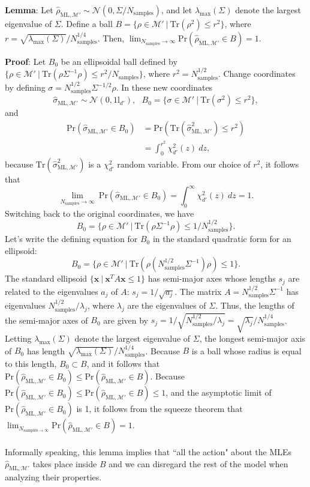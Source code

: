 \documentclass[aps,pra, twocolumn]{revtex4-1}
\newcommand{\M}{\mathcal{M}}
\newcommand{\Id}{\mathbb{I}}
\def\Id{1\!\mathrm{l}}
\newcommand{\rhohat}{\hat{\rho}}
\newcommand{\rhoML}[1]{\rhohat_{\scriptscriptstyle{\mathrm{ML},#1}}}
\begin{document}
\textbf{Lemma}: Let $\rhoML{\M'} \sim \mathcal{N}(0, \Sigma/N_{\mathrm{samples}})$, and let $\lambda_{\max}(\Sigma)$ denote the largest eigenvalue of $\Sigma$. Define a ball $B = \{\rho \in \M' ~|~\mathrm{Tr}(\rho^{2}) \leq r^{2}\}$, where $r = \sqrt{\lambda_{\max}(\Sigma)}/N_{\mathrm{samples}}^{1/4}$. Then, $\lim_{N_{\mathrm{samples}} \rightarrow \infty} \mathrm{Pr}(\rhoML{\M'} \in B) =1$.

\textbf{Proof}: Let $B_{0}$ be an ellipsoidal ball defined by $\{\rho \in \M'~|~\mathrm{Tr}(\rho \Sigma^{-1} \rho) \leq r^{2}/N_{\mathrm{samples}}\}$, where $r^{2} = N^{1/2}_{\mathrm{samples}}$. Change coordinates by defining $\sigma = N_{\mathrm{samples}}^{1/2}\Sigma^{-1/2}\rho$. In these new coordinates
\[\hat{\sigma}_{\mathrm{ML},\M'} \sim \mathcal{N}(0, \Id_{d'}),~~~B_{0} = \{\sigma \in \M'~|~\mathrm{Tr}(\sigma^{2}) \leq r^{2}\},\]
and
\begin{align*}
\mathrm{Pr}(\hat{\sigma}_{\mathrm{ML},\M'} \in B_{0}) &= \mathrm{Pr}(\mathrm{Tr}(\hat{\sigma}_{\mathrm{ML},\M'}^{2}) \leq r^{2})\\
&= \int_{0}^{r^{2}}\chi^{2}_{d'}(z)~dz,
\end{align*}
because $\mathrm{Tr}(\hat{\sigma}_{\mathrm{ML},\M'}^{2})$ is a $\chi^{2}_{d'}$ random variable. From our choice of $r^{2}$, it follows that
\[\lim_{N_{\mathrm{samples}} \rightarrow \infty}~\mathrm{Pr}(\hat{\sigma}_{\mathrm{ML},\M'} \in B_{0})  =\int_{0}^{\infty}\chi^{2}_{d'}(z)~dz =1.\]
Switching back to the original coordinates, we have
\[B_{0} = \{\rho \in \M'~|~\mathrm{Tr}(\rho \Sigma^{-1} \rho) \leq 1/N_{\mathrm{samples}}^{1/2}\}.\]
Let's write the defining equation for $B_{0}$ in the standard quadratic form for an ellipsoid:
\[B_{0} = \{\rho \in \M'~|~\mathrm{Tr}(\rho ( N_{\mathrm{samples}}^{1/2}\Sigma^{-1} ) \rho) \leq 1\}.\]
The standard ellipsoid $\{\mathbf{x}~|~\mathbf{x}^{T}A\mathbf{x} \leq 1\}$ has semi-major axes whose lengths $s_{j}$ are related to the eigenvalues $a_{j}$ of $A$: $s_{j} = 1/\sqrt{a_{j}}$. The matrix $A = N_{\mathrm{samples}}^{1/2}\Sigma^{-1}$ has eigenvalues $N_{\mathrm{samples}}^{1/2}/\lambda_{j}$, where $\lambda_{j}$ are the eigenvalues of $\Sigma$. Thus, the lengths of the semi-major axes of $B_{0}$ are given by $s_{j} = 1/\sqrt{N_{\mathrm{samples}}^{1/2}/\lambda_{j}} = \sqrt{\lambda_{j}}/N_{\mathrm{samples}}^{1/4}$. Letting $\lambda_{\max}(\Sigma)$ denote the largest eigenvalue of $\Sigma$, the longest semi-major axis of $B_{0}$ has length $\sqrt{\lambda_{\max}(\Sigma)}/N_{\mathrm{samples}}^{1/4}$.
Because $B$ is a ball whose radius is equal to this length, $B_{0} \subset B$, and it follows that $\mathrm{Pr}(\rhoML{\M'} \in B_{0}) \leq \mathrm{Pr}(\rhoML{\M'} \in B)$. Because $\mathrm{Pr}(\rhoML{\M'} \in B_{0}) \leq \mathrm{Pr}(\rhoML{\M'} \in B) \leq 1$, and the asymptotic limit of $\mathrm{Pr}(\rhoML{\M'} \in B_{0})$ is 1, it follows from the squeeze theorem that $\lim_{N_{\mathrm{samples}\rightarrow \infty}}\mathrm{Pr}(\rhoML{\M'} \in B)=1$.
~\\~\\
Informally speaking, this lemma implies that ``all the action" about the MLEs $\rhoML{\M'}$ takes place inside $B$ and we can disregard the rest of the model when analyzing their properties.
\end{document}

